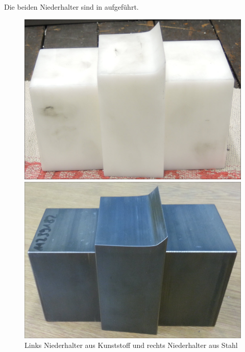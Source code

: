 \documentclass[12pt,a4paper,parskip]{scrartcl}
\begin{document}
Die beiden Niederhalter sind in aufgeführt.





\begin{figure}[H]
\centering
\begin{minipage}[t]{0.45\textwidth}
\includegraphics[width=.93\textwidth]{niederhalterkunst}
\end{minipage}
\begin{minipage}[t]{0.45\textwidth}
\includegraphics[width=.95\textwidth]{niederhalterS}
\end{minipage}
\caption{ Links Niederhalter aus Kunststoff und rechts Niederhalter aus Stahl}
\label{fig:nied}
\end{figure}
\newpage
\end{document}
